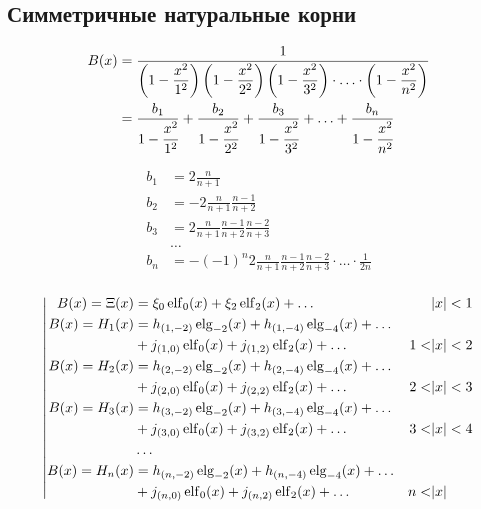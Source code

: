 
\subsection{Симметричные натуральные корни}

\begin{equation*} \begin{aligned}
B(x) &= \frac{1}{
\left(1 - \displaystyle \frac{x^2}{1^2} \right)
\left(1 - \displaystyle \frac{x^2}{2^2} \right)
\left(1 - \displaystyle \frac{x^2}{3^2} \right) \cdot
\ldots \cdot
\left(1 - \displaystyle \frac{x^2}{n^2} \right)
} \\ &
= \frac{b_1}{1 - \cfrac{x^2}{1^2}}
+ \frac{b_2}{1 - \cfrac{x^2}{2^2}}
+ \frac{b_3}{1 - \cfrac{x^2}{3^2}}
+ \ldots
+ \frac{b_n}{1 - \cfrac{x^2}{n^2}} \\
\end{aligned} \end{equation*}

\begin{equation*} \begin{aligned}
b_1 &=
  2
  \frac{n}{n + 1}
  \\
b_2 &=
  - 2
  \frac{n}{n + 1}
  \frac{n - 1}{n + 2}
  \\
b_3 &=
  2
  \frac{n}{n + 1}
  \frac{n - 1}{n + 2}
  \frac{n - 2}{n + 3}
  \\
&\ldots
  \\
b_n &=
  - (-1)^n 2
  \frac{n}{n + 1}
  \frac{n - 1}{n + 2}
  \frac{n - 2}{n + 3}
  \cdot
  \ldots
  \cdot
  \frac{1}{2 n}
  \\
\end{aligned} \end{equation*}

\begin{equation*} \left| \begin{aligned}
B(x) = \Xi(x) &=
  \xi_0 \elf_0(x)
+ \xi_2 \elf_2(x)  
+ \ldots & 
&|x| < 1 \\
%
B(x) = H_1(x) &= 
  h_{(1,-2)} \elg_{-2}(x)
+ h_{(1,-4)} \elg_{-4}(x)
+ \ldots \\ &
+ j_{(1,0)} \elf_0(x)
+ j_{(1,2)} \elf_2(x)
+ \ldots & 
1 < &|x| < 2 \\
%
B(x) = H_2(x) &=
  h_{(2,-2)} \elg_{-2}(x)
+ h_{(2,-4)} \elg_{-4}(x)
+ \ldots \\ &
+ j_{(2,0)} \elf_0(x)
+ j_{(2,2)} \elf_2(x)
+ \ldots & 
2 < &|x| < 3 \\
%
B(x) = H_3(x) &=
  h_{(3,-2)} \elg_{-2}(x)
+ h_{(3,-4)} \elg_{-4}(x)
+ \ldots \\ &
+ j_{(3,0)} \elf_0(x)
+ j_{(3,2)} \elf_2(x)
+ \ldots &
3 < &|x| < 4 \\
%
&\ldots & & \\
%
B(x) = H_n(x) &=
  h_{(n,-2)} \elg_{-2}(x)
+ h_{(n,-4)} \elg_{-4}(x)
+ \ldots \\ &
+ j_{(n,0)} \elf_0(x)
+ j_{(n,2)} \elf_2(x)
+ \ldots &
n < &|x| \\
\end{aligned} \right. \end{equation*}

